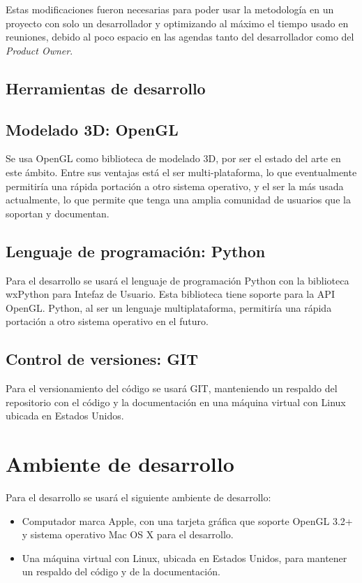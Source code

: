 Estas modificaciones fueron necesarias para poder usar la metodología en un proyecto con solo un desarrollador y optimizando al máximo el tiempo usado en reuniones, debido al poco espacio en las agendas tanto del desarrollador como del \emph{Product Owner}.

\subsection{Herramientas de desarrollo}
\label{herramientasdesarrollo}
\subsection{Modelado 3D: OpenGL}
Se usa OpenGL como biblioteca de modelado 3D, por ser el estado del arte en este ámbito. Entre sus ventajas está el ser multi-plataforma, lo que eventualmente permitiría una rápida portación a otro sistema operativo, y el ser la más usada actualmente, lo que permite que tenga una amplia comunidad de usuarios que la soportan y documentan.

\subsection{Lenguaje de programación: Python}
Para el desarrollo se usará el lenguaje de programación Python con la biblioteca wxPython para Intefaz de Usuario. Esta biblioteca tiene soporte para la API OpenGL. Python, al ser un lenguaje multiplataforma, permitiría una rápida portación a otro sistema operativo en el futuro.

\subsection{Control de versiones: GIT}
Para el versionamiento del código se usará GIT, manteniendo un respaldo del repositorio con el código y la documentación en una máquina virtual con Linux ubicada en Estados Unidos.

\section{Ambiente de desarrollo}
Para el desarrollo se usará el siguiente ambiente de desarrollo:
\begin{itemize}
	\item Computador marca Apple, con una tarjeta gráfica que soporte OpenGL 3.2+ y sistema operativo Mac OS X para el desarrollo.
	\item Una máquina virtual con Linux, ubicada en Estados Unidos, para mantener un respaldo del código y de la documentación.
\end{itemize}
